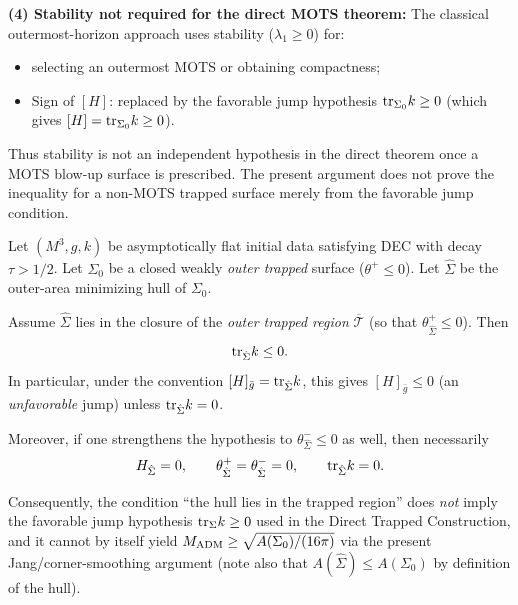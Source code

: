 \begin{remark}
\textbf{(4) Stability not required for the direct MOTS theorem:} The classical outermost-horizon approach uses stability ($\lambda_1 \ge 0$) for:
\begin{itemize}
    \item selecting an outermost MOTS or obtaining compactness;
    \item Sign of $[H]$: replaced by the favorable jump hypothesis $\mathrm{tr}_{\Sigma_0} k \ge 0$ (which gives $[H] = \mathrm{tr}_{\Sigma_0} k \ge 0$).
\end{itemize}
Thus stability is not an independent hypothesis in the direct theorem once a MOTS blow-up surface is prescribed. The present argument does not prove the inequality for a non-MOTS trapped surface merely from the favorable jump condition.
\end{remark}


\begin{theorem}\label{thm:HullJang}
Let $(M^3, g, k)$ be asymptotically flat initial data satisfying DEC with decay $\tau > 1/2$. Let $\Sigma_0$ be a closed weakly \emph{outer trapped} surface ($\theta^+ \le 0$). Let $\hat{\Sigma}$ be the outer-area minimizing hull of $\Sigma_0$.

Assume $\hat{\Sigma}$ lies in the closure of the \emph{outer trapped region} $\overline{\mathcal{T}}$ (so that $\theta^+_{\hat{\Sigma}} \le 0$). Then
\begin{equation}
    \mathrm{tr}_{\hat{\Sigma}} k \le 0.
\end{equation}
In particular, under the convention $[H]_{\bar{g}} = \mathrm{tr}_{\hat{\Sigma}} k$, this gives $[H]_{\bar{g}} \le 0$ (an \emph{unfavorable} jump) unless $\mathrm{tr}_{\hat{\Sigma}} k = 0$.

Moreover, if one strengthens the hypothesis to $\theta^-_{\hat{\Sigma}} \le 0$ as well, then necessarily
\[
    H_{\hat{\Sigma}} = 0,\qquad \theta^+_{\hat{\Sigma}} = \theta^-_{\hat{\Sigma}} = 0,\qquad \mathrm{tr}_{\hat{\Sigma}} k = 0.
\]

Consequently, the condition ``the hull lies in the trapped region'' does \emph{not} imply the favorable jump hypothesis $\mathrm{tr}_{\Sigma} k \ge 0$ used in the Direct Trapped Construction, and it cannot by itself yield
\(M_{\mathrm{ADM}} \ge \sqrt{A(\Sigma_0)/(16\pi)}\) via the present Jang/corner-smoothing argument (note also that $A(\hat{\Sigma}) \le A(\Sigma_0)$ by definition of the hull).
\end{theorem}

